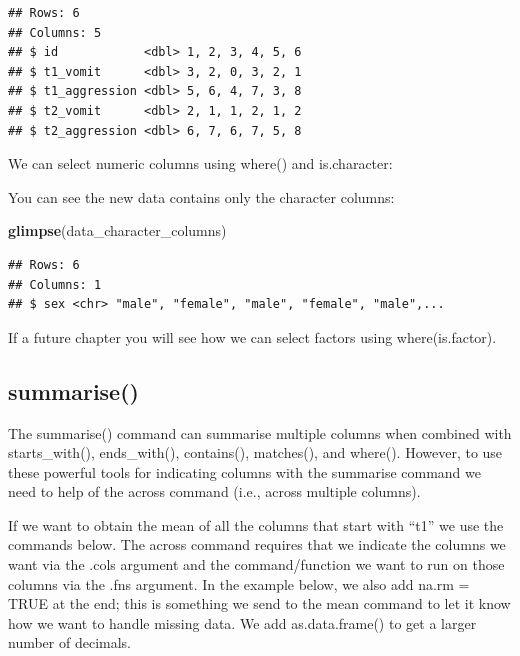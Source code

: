 \documentclass[
]{krantz}
\makeatletter
\newenvironment{Shaded}{\begin{snugshade}}{\end{snugshade}}
\newcommand{\KeywordTok}[1]{\textcolor[rgb]{0.27,0.27,0.27}{\textbf{#1}}}
\newcommand{\NormalTok}[1]{#1}
\newcommand{\OperatorTok}[1]{\textcolor[rgb]{0.43,0.43,0.43}{\textbf{#1}}}
\newcommand{\StringTok}[1]{\textcolor[rgb]{0.5,0.5,0.5}{#1}}
\newenvironment{kframe}{%
\medskip{}
\setlength{\fboxsep}{.8em}
 \def\at@end@of@kframe{}%
 \ifinner\ifhmode%
  \def\at@end@of@kframe{\end{minipage}}%
  \begin{minipage}{\columnwidth}%
 \fi\fi%
 \def\FrameCommand##1{\hskip\@totalleftmargin \hskip-\fboxsep
 \colorbox{shadecolor}{##1}\hskip-\fboxsep
     \hskip-\linewidth \hskip-\@totalleftmargin \hskip\columnwidth}%
 \MakeFramed {\advance\hsize-\width
   \@totalleftmargin\z@ \linewidth\hsize
   \@setminipage}}%
 {\par\unskip\endMakeFramed%
 \at@end@of@kframe}
\renewenvironment{Shaded}{\begin{kframe}}{\end{kframe}}
\makeatother
\begin{document}
\begin{verbatim}
## Rows: 6
## Columns: 5
## $ id            <dbl> 1, 2, 3, 4, 5, 6
## $ t1_vomit      <dbl> 3, 2, 0, 3, 2, 1
## $ t1_aggression <dbl> 5, 6, 4, 7, 3, 8
## $ t2_vomit      <dbl> 2, 1, 1, 2, 1, 2
## $ t2_aggression <dbl> 6, 7, 6, 7, 5, 8
\end{verbatim}

We can select numeric columns using where() and is.character:

\begin{Shaded}
\end{Shaded}

You can see the new data contains only the character columns:

\begin{Shaded}
\begin{Highlighting}[]
\KeywordTok{glimpse}\NormalTok{(data_character_columns)}
\end{Highlighting}
\end{Shaded}

\begin{verbatim}
## Rows: 6
## Columns: 1
## $ sex <chr> "male", "female", "male", "female", "male",...
\end{verbatim}

If a future chapter you will see how we can select factors using where(is.factor).

\hypertarget{summarise-1}{%
\subsection{summarise()}\label{summarise-1}}

The summarise() command can summarise multiple columns when combined with starts\_with(), ends\_with(), contains(), matches(), and where(). However, to use these powerful tools for indicating columns with the summarise command we need to help of the across command (i.e., across multiple columns).

If we want to obtain the mean of all the columns that start with ``t1'' we use the commands below. The across command requires that we indicate the columns we want via the .cols argument and the command/function we want to run on those columns via the .fns argument. In the example below, we also add na.rm = TRUE at the end; this is something we send to the mean command to let it know how we want to handle missing data. We add as.data.frame() to get a larger number of decimals.
\end{document}
